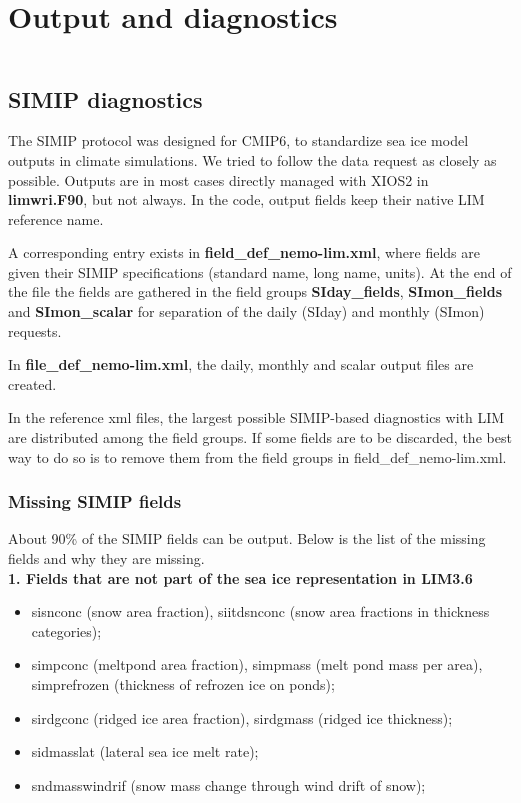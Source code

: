 \documentclass[../../tex_main/NEMO_manual]{subfiles}
\begin{document}

\chapter{Output and diagnostics}
\label{chap:DIA}
\minitoc

\newpage
$\ $\newline    %

\section{SIMIP diagnostics}

The SIMIP protocol \citep{Notzetal16} was designed for CMIP6, to standardize sea ice model outputs in climate simulations. We tried to follow the data request as closely as possible. Outputs are in most cases directly managed with XIOS2 in \textbf{limwri.F90}, but not always. In the code, output fields keep their native LIM reference name. 

A corresponding entry exists in \textbf{field\_def\_nemo-lim.xml}, where fields are given their SIMIP specifications (standard name, long name, units). At the end of the file the fields are gathered in the field groups \textbf{SIday\_fields}, \textbf{SImon\_fields} and \textbf{SImon\_scalar} for separation of the daily (SIday) and monthly (SImon) requests. 

In \textbf{file\_def\_nemo-lim.xml}, the daily, monthly and scalar output files are created.

In the reference xml files, the largest possible SIMIP-based diagnostics with LIM are distributed among the field groups. If some fields are to be discarded, the best way to do so is to remove them from the field groups in  field\_def\_nemo-lim.xml.

\subsection{Missing SIMIP fields}

About 90\% of the SIMIP fields can be output. Below is the list of the missing fields and why they are missing. \\

\textbf{1. Fields that are not part of the sea ice representation in LIM3.6}
\begin{itemize}
\item sisnconc (snow area fraction), siitdsnconc (snow area fractions in thickness categories);
\item simpconc (meltpond area fraction), simpmass (melt pond mass per area), simprefrozen (thickness of refrozen ice on ponds);
\item sirdgconc (ridged ice area fraction), sirdgmass (ridged ice thickness);
\item sidmasslat (lateral sea ice melt rate);
\item sndmasswindrif (snow mass change through wind drift of snow);
\end{itemize}
\end{document}
